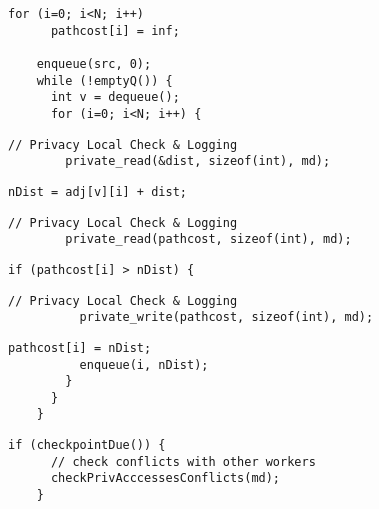   \begin{lstlisting}[morekeywords={pathcost},aboveskip=0pt, belowskip=0pt, firstnumber=auto,name=dij_checks]
    for (i=0; i<N; i++)
      pathcost[i] = inf;

    enqueue(src, 0);
    while (!emptyQ()) {
      int v = dequeue();
      for (i=0; i<N; i++) {
  \end{lstlisting}

  \begin{lstlisting}[morekeywords={pathcost,dist}, aboveskip=0pt,belowskip=0pt,backgroundcolor=\color{lightgray},
  firstnumber=auto, name=dij_checks]
        // Privacy Local Check & Logging
        private_read(&dist, sizeof(int), md);
  \end{lstlisting}

  \begin{lstlisting}[morekeywords={pathcost,dist}, aboveskip=0pt, belowskip=0pt, firstnumber=auto,name=dij_checks]
        nDist = adj[v][i] + dist;
  \end{lstlisting}

  \begin{lstlisting}[morekeywords={pathcost}, aboveskip=0pt,belowskip=0pt,backgroundcolor=\color{lightgray},
  firstnumber=auto, name=dij_checks]
        // Privacy Local Check & Logging
        private_read(pathcost, sizeof(int), md);
  \end{lstlisting}


  \begin{lstlisting}[morekeywords={pathcost}, aboveskip=0pt, belowskip=0pt, firstnumber=auto,name=dij_checks]
        if (pathcost[i] > nDist) {
  \end{lstlisting}

  \begin{lstlisting}[morekeywords={pathcost}, aboveskip=0pt,belowskip=0pt,backgroundcolor=\color{lightgray},
  firstnumber=auto, name=dij_checks]
          // Privacy Local Check & Logging
          private_write(pathcost, sizeof(int), md);
  \end{lstlisting}

  \begin{lstlisting}[morekeywords={pathcost}, aboveskip=0pt, belowskip=0pt, firstnumber=auto,name=dij_checks]
          pathcost[i] = nDist;
          enqueue(i, nDist);
        }
      }
    }
    \end{lstlisting}

  \begin{lstlisting}[morekeywords={pathcost}, aboveskip=0pt,belowskip=0pt,backgroundcolor=\color{lightgray},
  firstnumber=auto, name=dij_checks]
    if (checkpointDue()) {
      // check conflicts with other workers
      checkPrivAcccessesConflicts(md);
    }
  \end{lstlisting}

